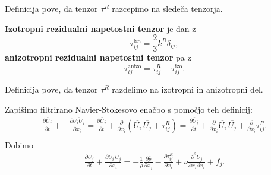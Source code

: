 \documentclass[mat2, tisk]{fmfdelo}
\begin{document}
Definicija pove, da  tenzor $\tau^R$ razcepimo na sledeča tenzorja. 

\begin{definicija}
\textbf{Izotropni rezidualni napetostni tenzor} je dan z 
\begin{equation*}
\tau_{ij}^\text{izo} = \frac{2}{3} k^R \delta_{ij},
\end{equation*}
\textbf{anizotropni rezidualni napetostni tenzor} pa z 
\begin{equation*}
\tau_{ij}^\text{anizo} = \tau_{ij}^R - \tau_{ij}^\text{izo}.
\end{equation*}
\end{definicija}
Definicija pove, da tenzor $\tau^R$ razdelimo na izotropni in anizotropni del. 

Zapišimo filtrirano Navier-Stokesovo enačbo s pomočjo teh definicij:
\begin{align*}
\frac{\partial \overline{U}_j}{\partial t} + &\frac{\partial \overline{U_i U_j}}{\partial x_i} = 
\frac{\partial \overline{U}_j}{\partial t} + \frac{\partial}{\partial x_i} (\overline{U_i}\, \overline{U_j} + \tau_{ij}^R) = 
\frac{\partial \overline{U}_j}{\partial t} + \frac{\partial}{\partial x_i} \overline{U_i}\, \overline{U_j} + \frac{\partial}{\partial x_i} \tau_{ij}^R.\\[2mm]
\end{align*}
Dobimo
\begin{align*}
\frac{\partial \overline{U}_j}{\partial t} + \frac{\partial \overline{U_i}\, \overline{U_j}}{\partial x_i} = -\frac{1}{\rho} \frac{\partial \overline{p}}{\partial x_j} 
- \frac{\partial \tau_{ij}^R}{\partial x_i}+ \nu \frac{\partial^2 \overline{U}_j}{\partial x_i \partial x_i} + \overline{f}_j.
\end{align*}
\end{document}
